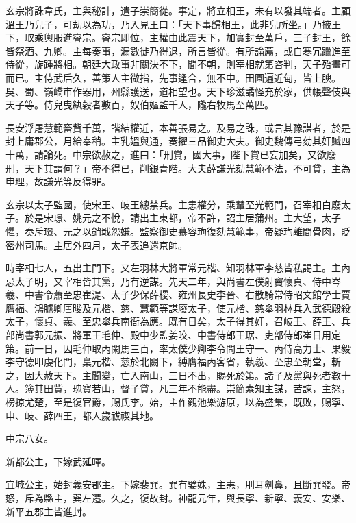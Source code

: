 \begin{pinyinscope}
 玄宗將誅韋氏，主與秘計，遣子崇簡從。事定，將立相王，未有以發其端者。主顧溫王乃兒子，可劫以為功，乃入見王曰：「天下事歸相王，此非兒所坐。」乃掖王下，取乘輿服進睿宗。睿宗即位，主權由此震天下，加實封至萬戶，三子封王，餘皆祭酒、九卿。主每奏事，漏數徙乃得退，所言皆從。有所論薦，或自寒冗躐進至侍從，旋踵將相。朝廷大政事非關決不下，聞不朝，則宰相就第咨判，天子殆畫可而已。主侍武后久，善策人主微指，先事逢合，無不中。田園遍近甸，皆上腴。吳、蜀、嶺嶠市作器用，州縣護送，道相望也。天下珍滋譎怪充於家，供帳聲伎與天子等。侍兒曳紈穀者數百，奴伯嫗監千人，隴右牧馬至萬匹。



 長安浮屠慧範畜貲千萬，諧結權近，本善張易之。及易之誅，或言其豫謀者，於是封上庸郡公，月給奉稍。主乳媼與通，奏擢三品御史大夫。御史魏傳弓劾其奸贓四十萬，請論死。中宗欲赦之，進曰：「刑賞，國大事，陛下賞已妄加矣，又欲廢刑，天下其謂何？」帝不得已，削銀青階。大夫薛謙光劾慧範不法，不可貸，主為申理，故謙光等反得罪。



 玄宗以太子監國，使宋王、岐王總禁兵。主恚權分，乘輦至光範門，召宰相白廢太子。於是宋璟、姚元之不悅，請出主東都，帝不許，詔主居蒲州。主大望，太子懼，奏斥璟、元之以銷戢怨嫌。監察御史慕容珣復劾慧範事，帝疑珣離間骨肉，貶密州司馬。主居外四月，太子表追還京師。



 時宰相七人，五出主門下。又左羽林大將軍常元楷、知羽林軍李慈皆私謁主。主內忌太子明，又宰相皆其黨，乃有逆謀。先天二年，與尚書左僕射竇懷貞、侍中岑羲、中書令蕭至忠崔湜、太子少保薛稷、雍州長史李晉、右散騎常侍昭文館學士賈膺福、鴻臚卿唐晙及元楷、慈、慧範等謀廢太子，使元楷、慈舉羽林兵入武德殿殺太子，懷貞、羲、至忠舉兵南衙為應。既有日矣，太子得其奸，召岐王、薛王、兵部尚書郭元振、將軍王毛仲、殿中少監姜晈、中書侍郎王琚、吏部侍郎崔日用定策。前一日，因毛仲取內閑馬三百，率太僕少卿李令問王守一、內侍高力士、果毅李守德叩虔化門，梟元楷、慈於北闕下，縛膺福內客省，執羲、至忠至朝堂，斬之，因大赦天下。主聞變，亡入南山，三日不出，賜死於第。諸子及黨與死者數十人。簿其田貲，瑰寶若山，督子貸，凡三年不能盡。崇簡素知主謀，苦諫，主怒，榜掠尤楚，至是復官爵，賜氏李。始，主作觀池樂游原，以為盛集，既敗，賜寧、申、岐、薛四王，都人歲祓禊其地。



 中宗八女。



 新都公主，下嫁武延暉。



 宜城公主，始封義安郡主。下嫁裴巽。巽有嬖姝，主恚，刖耳劓鼻，且斷巽發。帝怒，斥為縣主，巽左遷。久之，復故封。神龍元年，與長寧、新寧、義安、安樂、新平五郡主皆進封。




\end{pinyinscope}
